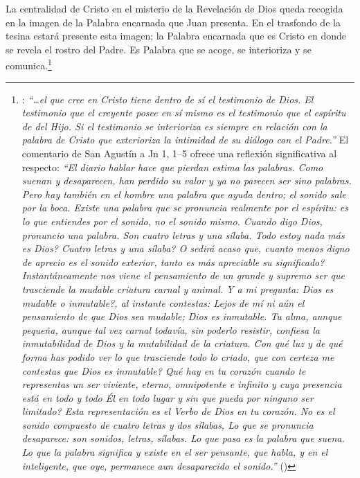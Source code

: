\documentclass[11pt]{article}
\begin{document}
La centralidad de Cristo en el misterio de la Revelación de Dios queda recogida en la imagen de la Palabra encarnada que Juan presenta. En el trasfondo de la tesina estará presente esta imagen; la Palabra encarnada que es Cristo en donde se revela el rostro del Padre. Es Palabra que se acoge, se interioriza y se comunica.\footnote{\cite[1530]{dicctf}: \emph{``\ldots{}el que cree en Cristo tiene dentro de sí el testimonio de Dios. El testimonio que el creyente posee en sí mismo es el testimonio que el espíritu de del Hijo. Si el testimonio se interioriza es siempre en relación con la palabra de Cristo que exterioriza la intimidad de su diálogo con el Padre.''} El comentario de San Agustín a Jn 1, 1--5 ofrece una reflexión significativa al respecto:
\emph{``El diario hablar hace que pierdan estima las palabras. Como suenan y desaparecen, han perdido su valor y ya no parecen ser sino palabras. Pero hay también en el hombre una palabra que ayuda dentro; el sonido sale por la boca. Existe una palabra que se pronuncia realmente por el espíritu: es lo que entiendes por el sonido, no el sonido mismo. Cuando digo Dios, pronuncio una palabra. Son cuatro letras y una sílaba. \textquestiondown{}Todo estoy nada más es Dios? \textquestiondown{}Cuatro letras y una sílaba? \textquestiondown{}O sedirá acaso que, cuanto menos digno de aprecio es el sonido exterior, tanto es más apreciable su significado? Instantáneamente nos viene el pensamiento de un grande y supremo ser que trasciende la mudable criatura carnal y animal. Y a mi pregunta: \textquestiondown{}Dios es mudable o inmutable?, al instante contestas: Lejos de mí ni aún el pensamiento de que Dios sea mudable; Dios es inmutable. Tu alma, aunque pequeña, aunque tal vez carnal todavía, sin poderlo resistir, confiesa la inmutabilidad de Dios y la mutabilidad de la criatura. \textquestiondown{}Con qué luz y de qué forma has podido ver lo que trasciende todo lo criado, que con certeza me contestas que Dios es inmutable? \textquestiondown{}Qué hay en tu corazón cuando te representas un ser viviente, eterno, omnipotente e infinito y cuya presencia está en todo y todo Él en todo lugar y sin que pueda por ninguno ser limitado? Esta representación es el Verbo de Dios en tu corazón. No es el sonido compuesto de cuatro letras y dos sílabas, Lo que se pronuncia desaparece: son sonidos, letras, sílabas. Lo que pasa es la palabra que suena. Lo que la palabra significa y existe en el ser pensante, que habla, y en el inteligente, que oye, permanece aun desaparecido el sonido.''} (\cite[Tratado I, n.~1, 8]{aguscomentjn}) 
}
\end{document}
